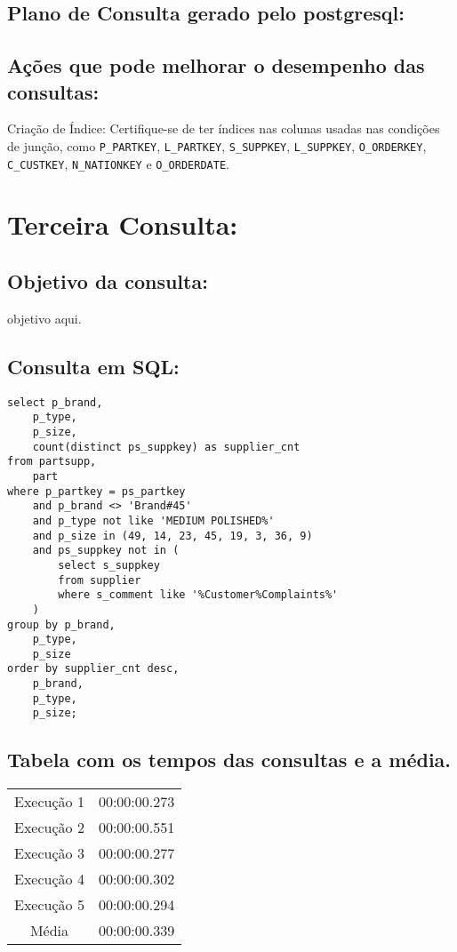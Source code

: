 \documentclass[12pt]{article}
\begin{document}
\begin{landscape}
\subsection{Plano de Consulta gerado pelo postgresql:}

\subsection{Ações que pode melhorar o desempenho das 
consultas:} Criação de Índice: Certifique-se de ter índices nas colunas usadas nas condições de junção, como \texttt{P\_PARTKEY}, \texttt{L\_PARTKEY}, \texttt{S\_SUPPKEY}, \texttt{L\_SUPPKEY}, \texttt{O\_ORDERKEY}, \texttt{C\_CUSTKEY}, \texttt{N\_NATIONKEY} e \texttt{O\_ORDERDATE}.

\section{Terceira Consulta:}


\subsection{Objetivo da consulta:}
objetivo aqui.
\subsection{Consulta em SQL:}
\begin{lstlisting}
select p_brand,
	p_type,
	p_size,
	count(distinct ps_suppkey) as supplier_cnt
from partsupp,
	part
where p_partkey = ps_partkey
	and p_brand <> 'Brand#45'
	and p_type not like 'MEDIUM POLISHED%'
	and p_size in (49, 14, 23, 45, 19, 3, 36, 9)
	and ps_suppkey not in (
		select s_suppkey
		from supplier
		where s_comment like '%Customer%Complaints%'
	)
group by p_brand,
	p_type,
	p_size
order by supplier_cnt desc,
	p_brand,
	p_type,
	p_size;
\end{lstlisting}

\subsection{Tabela com os tempos das consultas e a média.}
\begin{tabular}{|c|c|}
  \hline
  Execução 1 & 00:00:00.273 \\
  Execução 2 & 00:00:00.551 \\
  Execução 3 & 00:00:00.277 \\
  Execução 4 & 00:00:00.302 \\
  Execução 5 & 00:00:00.294 \\
  \hline
  Média & 00:00:00.339 \\
  \hline
\end{tabular}


\end{landscape}
\end{document}
